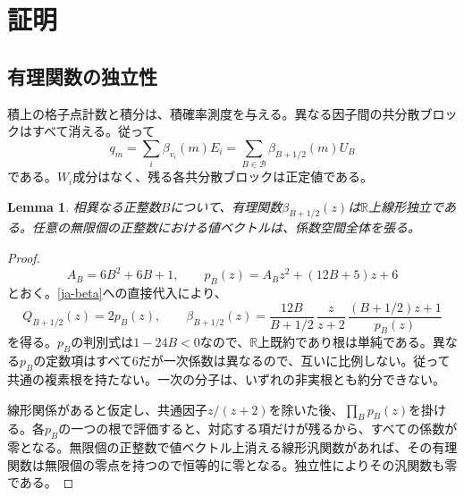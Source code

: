 \documentclass[12pt]{amsart}
\newtheorem{lem}[thm]{Lemma}
\theoremstyle{definition}
\theoremstyle{remark}
\numberwithin{equation}{section}
\newcommand{\R}{\mathbb{R}}
\begin{document}
\section{証明}

\subsection{有理関数の独立性}
積上の格子点計数と積分は、積確率測度を与える。異なる因子間の共分散ブロックはすべて消える。従って
\begin{equation}\label{ja-productq}
 q_m=\sum_i\beta_{v_i}(m)E_i
     =\sum_{B\in\mathcal B}\beta_{B+1/2}(m)U_B
\end{equation}
である。$W_i$成分はなく、残る各共分散ブロックは正定値である。

\begin{lem}\label{ja-independence}
相異なる正整数$B$について、有理関数$\beta_{B+1/2}(z)$は$\R$上線形独立である。任意の無限個の正整数における値ベクトルは、係数空間全体を張る。
\end{lem}
\begin{proof}
\begin{equation}\label{ja-quadratics}
 A_B=6B^2+6B+1,\qquad
 p_B(z)=A_Bz^2+(12B+5)z+6
\end{equation}
とおく。\eqref{ja-beta}への直接代入により、
\[
 Q_{B+1/2}(z)=2p_B(z),\qquad
 \beta_{B+1/2}(z)=\frac{12B}{B+1/2}\,
 \frac{z}{z+2}\,\frac{(B+1/2)z+1}{p_B(z)}
\]
を得る。$p_B$の判別式は$1-24B<0$なので、$\R$上既約であり根は単純である。異なる$p_B$の定数項はすべて$6$だが一次係数は異なるので、互いに比例しない。従って共通の複素根を持たない。一次の分子は、いずれの非実根とも約分できない。

線形関係があると仮定し、共通因子$z/(z+2)$を除いた後、$\prod_Bp_B(z)$を掛ける。各$p_B$の一つの根で評価すると、対応する項だけが残るから、すべての係数が零となる。無限個の正整数で値ベクトル上消える線形汎関数があれば、その有理関数は無限個の零点を持つので恒等的に零となる。独立性によりその汎関数も零である。
\end{proof}
\end{document}
